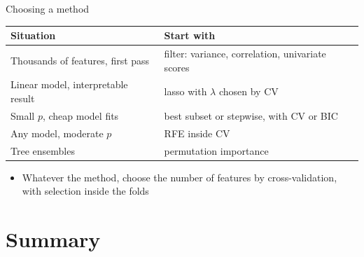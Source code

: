 \begin{frame}{Choosing a method}
    \centering
    \footnotesize
    \begin{tabular}{@{}l l@{}}
        \toprule
        Situation & Start with \\
        \midrule
        Thousands of features, first pass & filter: variance, correlation, univariate scores \\
        Linear model, interpretable result & lasso with $\lambda$ chosen by CV \\
        Small $p$, cheap model fits & best subset or stepwise, with CV or BIC \\
        Any model, moderate $p$ & RFE inside CV \\
        Tree ensembles & permutation importance \\
        \bottomrule
    \end{tabular}

    \svspace{0.8em}
    \raggedright
    \begin{itemize}
        \item Whatever the method, choose the number of features by cross-validation, with selection inside the folds
    \end{itemize}
\end{frame}


\section{Summary}

